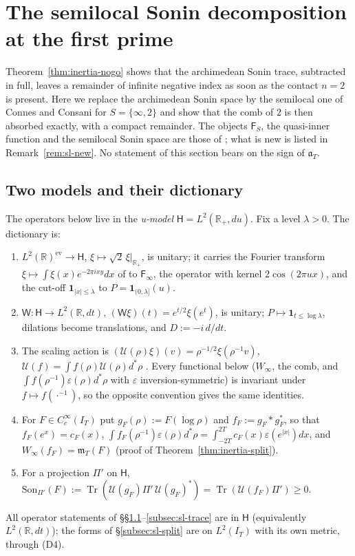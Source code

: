 \documentclass[11pt]{amsart}
\theoremstyle{definition}
\theoremstyle{remark}
\newcommand{\R}{\mathbb R}
\newcommand{\IT}{I_T}
\newcommand{\cF}{c_F}
\newcommand{\mT}{\mathfrak m_T}
\begin{document}
\section{The semilocal Sonin decomposition at the first prime}\label{sec:semilocal}

Theorem~\ref{thm:inertia-nogo} shows that the archimedean Sonin trace, subtracted in full, leaves a remainder of
infinite negative index as soon as the contact $n=2$ is present. Here we replace the archimedean Sonin space by
the semilocal one of Connes and Consani for $S=\{\infty,2\}$ and show that the comb of $2$ is then absorbed
exactly, with a compact remainder. The objects $\mathsf F_S$, the
quasi-inner function and the semilocal Sonin space are those of \cite{CCquasi2020,CCM2023}; what is new is listed in
Remark~\ref{rem:sl-new}. No statement of this section bears on the sign of $\mathfrak a_T$.

\subsection{Two models and their dictionary}\label{subsec:sl-dict}
The operators below live in the \emph{u-model} $\mathsf H=L^2(\R_+,du)$. Fix a level $\lambda>0$. The dictionary is:
\begin{enumerate}
\item[(D1)] $L^2(\R)^{\mathrm{ev}}\to\mathsf H$, $\xi\mapsto\sqrt2\,\xi|_{\R_+}$, is unitary; it carries the Fourier transform
$\xi\mapsto\int\xi(x)e^{-2\pi ixy}dx$ of \cite{ConnesConsani2021} to $\mathsf F_\infty$, the operator with kernel
$2\cos(2\pi ux)$, and the cut-off $\mathbf 1_{|x|\le\lambda}$ to $P=\mathbf 1_{(0,\lambda]}(u)$.
\item[(D2)] $\mathsf W:\mathsf H\to L^2(\R,dt)$, $(\mathsf W\xi)(t)=e^{t/2}\xi(e^t)$, is unitary; $P\mapsto\mathbf 1_{t\le\log\lambda}$,
dilations become translations, and $D:=-i\,d/dt$.
\item[(D3)] The scaling action is $(\mathcal U(\rho)\xi)(v)=\rho^{-1/2}\xi(\rho^{-1}v)$, $\mathcal U(f)=\int f(\rho)\mathcal U(\rho)d^*\rho$
\cite[(61)]{ConnesConsani2021}. Every functional below ($W_\infty$, the comb, and $\int f(\rho^{-1})\varepsilon(\rho)d^*\rho$ with
$\varepsilon$ inversion-symmetric) is invariant under $f\mapsto f(\cdot^{-1})$, so the opposite convention gives the same
identities.
\item[(D4)] For $F\in C_c^\infty(\IT)$ put $g_F(\rho):=F(\log\rho)$ and $f_F:=g_F*g_F^*$, so that $f_F(e^x)=\cF(x)$,
$\int f_F(\rho^{-1})\varepsilon(\rho)d^*\rho=\int_{-2T}^{2T}\cF(x)\varepsilon(e^{|x|})dx$, and $W_\infty(f_F)=\mT(F)$ (proof of
Theorem~\ref{thm:inertia-split}).
\item[(D5)] For a projection $\Pi'$ on $\mathsf H$, $\mathrm{Son}_{\Pi'}(F):=\operatorname{Tr}(\mathcal U(g_F)\Pi'\,\mathcal U(g_F)^*)
=\operatorname{Tr}(\mathcal U(f_F)\Pi')\ge0$.
\end{enumerate}
All operator statements of \S\S\ref{subsec:sl-dict}--\ref{subsec:sl-trace} are in $\mathsf H$ (equivalently $L^2(\R,dt)$);
the forms of \S\ref{subsec:sl-split} are on $L^2(\IT)$ with its own metric, through (D4).
\end{document}
